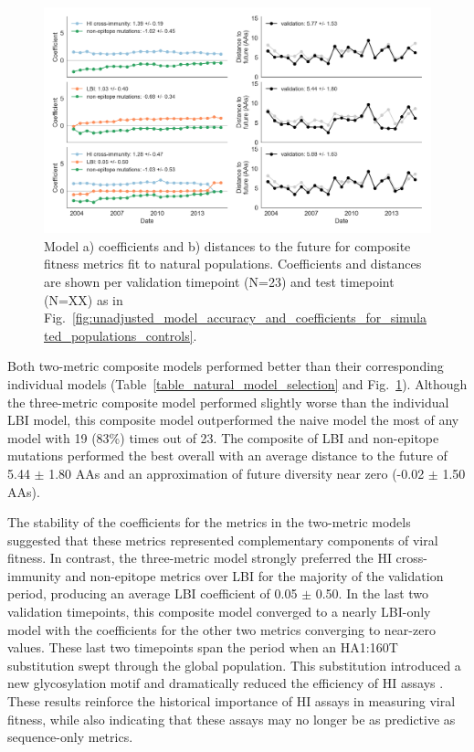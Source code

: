 \begin{figure}[ht]
  \begin{center}
  \includegraphics[width=\textwidth]{figures/best-composite-unadjusted-model-accuracy-and-coefficients-for-natural-populations.png}
  \caption{
    Model a) coefficients and b) distances to the future for composite fitness metrics fit to natural populations.
    Coefficients and distances are shown per validation timepoint (N=23) and test timepoint (N=XX) as in Fig.~\ref{fig:unadjusted_model_accuracy_and_coefficients_for_simulated_populations_controls}.
  }
  \label{fig:unadjusted_composite_model_accuracy_and_coefficients_for_natural_populations}
  \end{center}
\end{figure}

Both two-metric composite models performed better than their corresponding individual models (Table~\ref{table_natural_model_selection} and Fig.~\ref{fig:unadjusted_composite_model_accuracy_and_coefficients_for_natural_populations}).
Although the three-metric composite model performed slightly worse than the individual LBI model, this composite model outperformed the naive model the most of any model with 19 (83\%) times out of 23.
The composite of LBI and non-epitope mutations performed the best overall with an average distance to the future of 5.44 $\pm$ 1.80 AAs and an approximation of future diversity near zero (-0.02 $\pm$ 1.50 AAs).

The stability of the coefficients for the metrics in the two-metric models suggested that these metrics represented complementary components of viral fitness.
In contrast, the three-metric model strongly preferred the HI cross-immunity and non-epitope metrics over LBI for the majority of the validation period, producing an average LBI coefficient of 0.05 $\pm$ 0.50.
In the last two validation timepoints, this composite model converged to a nearly LBI-only model with the coefficients for the other two metrics converging to near-zero values.
These last two timepoints span the period when an HA1:160T substitution swept through the global population.
This substitution introduced a new glycosylation motif and dramatically reduced the efficiency of HI assays \cite{Zost2017}.
These results reinforce the historical importance of HI assays in measuring viral fitness, while also indicating that these assays may no longer be as predictive as sequence-only metrics.

